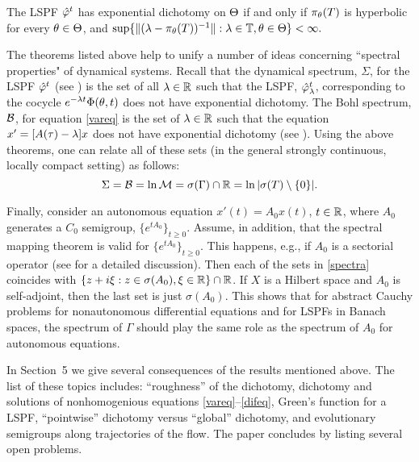 \begin{introPDT} The LSPF ${\hat{\varphi}}^t$ has
exponential dichotomy on $\Theta$ if and only if $\pi_\theta(T)$ is
hyperbolic for every $\theta\in \Theta$, and
$\sup\{\|(\lambda-\pi_\theta(T))^{-1}\|: \lambda\in{\Bbb{T}},\theta\in \Theta\}
<\infty.$
\end{introPDT}

The theorems listed above help to unify a number of
ideas concerning ``spectral properties" of dynamical systems.
Recall that the dynamical spectrum, $\Sigma$, for the LSPF ${\hat{\varphi}}^t$
(see \cite{SSSpT}) is the set of all $\lambda\in{\Bbb{R}}$ such that the
LSPF, ${\hat{\varphi}}^t_\lambda$, corresponding to the cocycle $e^{-\lambda
t}\Phi(\theta,t)$ does not have exponential dichotomy.
The Bohl spectrum, ${\cal{B}}$, for equation \eqref{vareq}
is the set of $\lambda\in{\Bbb{R}}$ such that the equation
$x'=[A(\tau)-\lambda]x$ does not have exponential dichotomy
(see \cite{DK}).
Using the above theorems, one can relate all of these sets
(in the general strongly continuous, locally compact setting) as
follows:
\begin{equation}\label{spectra}
\Sigma={\cal{B}}=\ln {\cal{M}}=\sigma
(\Gamma)\cap{\Bbb{R}}=\ln|\sigma(T)\setminus\{0\}|.
\end{equation}

Finally, consider an autonomous equation $x'(t)=A_0x(t)$,
$t\in{\Bbb{R}}$, where $A_0$  generates a $C_0$ semigroup,
$\{e^{tA_0}\}_{t\ge0}$. Assume, in addition, that the spectral
mapping theorem is valid for $\{e^{tA_0}\}_{t\ge0}$. This happens,
e.g., if $A_0$ is a sectorial operator (see \cite{Nag} for a detailed
discussion). Then each of the sets in \eqref{spectra} coincides with
$\{z+i\xi: z\in\sigma (A_0), \xi\in{\Bbb{R}}\}\cap{\Bbb{R}}$. If $X$ is a
Hilbert space and $A_0$ is self-adjoint, then the last set is just
$\sigma(A_0)$.  This shows that for abstract Cauchy problems for
nonautonomous differential equations and for LSPFs in Banach spaces,
the spectrum of $\Gamma$  should play the same role as the
spectrum of $A_0$ for autonomous equations.

In Section~5 we give several consequences of the results
mentioned above. The list of these topics
includes: ``roughness'' of
the dichotomy, dichotomy and solutions of
nonhomogenious equations \eqref{vareq}--\eqref{difeq},
Green's function for a LSPF,
``pointwise'' dichotomy versus ``global'' dichotomy, and
evolutionary semigroups along trajectories of the flow.
The paper concludes by listing several open problems.

